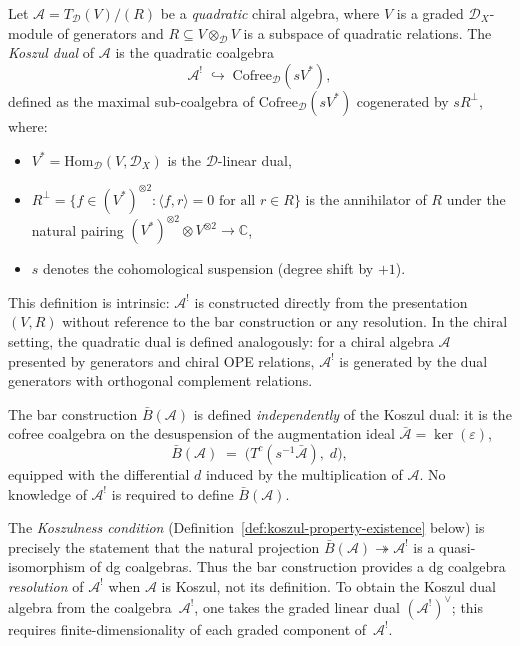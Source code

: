 \begin{definition}\label{def:koszul-dual-quadratic}
Let $\mathcal{A} = T_{\mathcal{D}}(V) / (R)$ be a \emph{quadratic} chiral algebra,
where $V$ is a graded $\mathcal{D}_X$-module of generators and
$R \subseteq V \otimes_{\mathcal{D}} V$ is a subspace of quadratic relations.
The \emph{Koszul dual} of $\mathcal{A}$ is the quadratic coalgebra
\begin{equation}\label{eq:koszul-dual-quadratic}
\mathcal{A}^! \;\hookrightarrow\; \text{Cofree}_{\mathcal{D}}(sV^*),
\end{equation}
defined as the maximal sub-coalgebra of $\text{Cofree}_{\mathcal{D}}(sV^*)$ cogenerated by $sR^\perp$,
where:
\begin{itemize}
\item $V^* = \text{Hom}_{\mathcal{D}}(V, \mathcal{D}_X)$ is the $\mathcal{D}$-linear dual,
\item $R^\perp = \{ f \in (V^*)^{\otimes 2} : \langle f, r \rangle = 0
      \text{ for all } r \in R \}$ is the annihilator of $R$ under the
      natural pairing $(V^*)^{\otimes 2} \otimes V^{\otimes 2} \to \mathbb{C}$,
\item $s$ denotes the cohomological suspension (degree shift by $+1$).
\end{itemize}
This definition is intrinsic: $\mathcal{A}^!$ is constructed directly from the
presentation $(V, R)$ without reference to the bar construction or any
resolution.  In the chiral setting, the quadratic dual is defined analogously:
for a chiral algebra $\mathcal{A}$ presented by generators and chiral OPE
relations, $\mathcal{A}^!$ is generated by the dual generators with orthogonal
complement relations.
\end{definition}

\begin{remark}\label{rem:bar-vs-quadratic-dual}
The bar construction $\bar{B}(\mathcal{A})$ is defined \emph{independently} of the
Koszul dual: it is the cofree coalgebra on the desuspension of the augmentation
ideal $\bar{\mathcal{A}} = \ker(\varepsilon)$,
\[\bar{B}(\mathcal{A}) \;=\; \bigl(T^c(s^{-1}\bar{\mathcal{A}}),\; d\bigr),\]
equipped with the differential $d$ induced by the multiplication of $\mathcal{A}$.
No knowledge of $\mathcal{A}^!$ is required to define $\bar{B}(\mathcal{A})$.

The \emph{Koszulness condition} (Definition~\ref{def:koszul-property-existence}
below) is precisely the statement that the natural projection
$\bar{B}(\mathcal{A}) \twoheadrightarrow \mathcal{A}^!$ is a quasi-isomorphism
of dg coalgebras.
Thus the bar construction provides a dg coalgebra \emph{resolution} of
$\mathcal{A}^!$ when $\mathcal{A}$ is Koszul, not its definition.
To obtain the Koszul dual algebra from the coalgebra~$\mathcal{A}^!$,
one takes the graded linear dual $(\mathcal{A}^!)^{\vee}$; this
requires finite-dimensionality of each graded component
of~$\mathcal{A}^!$.
\end{remark}

